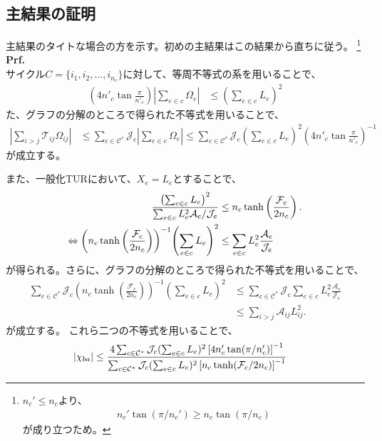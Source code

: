 \documentclass[a4paper,11pt]{jsarticle}
\numberwithin{equation}{section}
\begin{document}
\subsection{主結果の証明}
主結果のタイトな場合の方を示す。初めの主結果はこの結果から直ちに従う。
\footnote{
    $n_c' \leq n_c$より、
    \begin{align}
        n_c'\tan(\pi/n_c') \geq  n_c\tan(\pi/n_c) 
    \end{align}
    が成り立つため。
}
\\
\textbf{Prf.}\\
サイクル$C = \{i_1, i_2, \ldots, i_{n_c}\}$に対して、等周不等式の系を用いることで、
\begin{align}
\left( 4n'_c \tan \frac{\pi}{n'_c} \right)
\left| \sum_{e \in c} \Omega_e \right|
&\leq
\left( \sum_{e \in c} L_e \right)^2
\end{align}た、グラフの分解のところで得られた不等式を用いることで、
\begin{align}
\left| \sum_{i>j} \mathcal{T}_{ij} \Omega_{ij} \right|
&\leq
\sum_{c \in \mathcal{C}^*} \mathcal{J}_c 
\left| \sum_{e \in c} \Omega_e \right|
\leq
\sum_{c \in \mathcal{C}^*} \mathcal{J}_c
\left( \sum_{e \in c} L_e \right)^2
\left( 4n'_c \tan \frac{\pi}{n'_c} \right)^{-1}
\end{align}
が成立する。

また、一般化TURにおいて、$X_e = L_e$とすることで、
\begin{align}
    \frac{\left( \sum_{e \in c} L_e \right)^2}{\sum_{e \in c} L_e^2 \mathcal{A}_e / \mathcal{J}_e}
&\leq n_c \tanh\left( \frac{\mathcal{F}_c}{2 n_c} \right).\\
\Leftrightarrow \qty(n_c \tanh\left( \frac{\mathcal{F}_c}{2 n_c} \right))^{-1}
\qty( \sum_{e \in c} L_e )^2
&\leq \sum_{e \in c} L_e^2 \frac{\mathcal{A}_e}{\mathcal{J}_e}
\end{align}
が得られる。さらに、グラフの分解のところで得られた不等式を用いることで、
\begin{align}
    \sum_{c \in \mathcal{C}^*} \mathcal{J}_c
\left( n_c \tanh\left( \frac{\mathcal{F}_c}{2 n_c} \right) \right)^{-1}
\left( \sum_{e \in c} L_e \right)^2
&\leq
\sum_{c \in \mathcal{C}^*} \mathcal{J}_c
\sum_{e \in c} L_e^2 \frac{\mathcal{A}_e}{\mathcal{J}_e} \\
&\leq
\sum_{i>j} \mathcal{A}_{ij} L_{ij}^2.
\end{align}
が成立する。
これら二つの不等式を用いることで、
\begin{align}
\abs{\chi_{ba}}
&\leq
\frac{
4 \sum_{c \in \mathcal{C}^*} \mathcal{J}_c (\sum_{e \in c} L_e)^2
\left[ 4n'_c \tan(\pi / n'_c) \right]^{-1}
}{
\sum_{c \in \mathcal{C}^*} \mathcal{J}_c (\sum_{e \in c} L_e)^2
\left[ n_c \tanh(\mathcal{F}_c / 2n_c) \right]^{-1}
}
\end{align}
\end{document}
